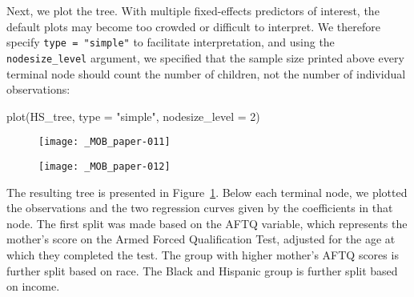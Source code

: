 \documentclass[doc,floatsintext,natbib]{apa7}
\begin{document}
Next, we plot the tree. With multiple fixed-effects predictors of interest, the default plots may become too crowded or difficult to interpret. We therefore specify \verb|type = "simple"| to facilitate interpretation, and using the \verb|nodesize_level| argument, we specified that the sample size printed above every terminal node should count the number of children, not the number of individual observations:

\begin{Schunk}
\begin{Sinput}
 plot(HS_tree, type = "simple", nodesize_level = 2)
\end{Sinput}
\end{Schunk}

\begin{figure}%
\caption{}
\texttt{[image: \_MOB\_paper-011]}

\vspace*{-3cm}

\texttt{[image: \_MOB\_paper-012]}
\label{fig:lmm_tree}
\end{figure}%

The resulting tree is presented in Figure~\ref{fig:lmm_tree}. Below each terminal node, we plotted the observations and the two regression curves given by the coefficients in that node. The first split was made based on the AFTQ variable, which represents the mother's score on the Armed Forced Qualification Test, adjusted for the age at which they completed the test. The group with higher mother's AFTQ scores is further split based on race. The Black and Hispanic group is further split based on income. 
\end{document}

